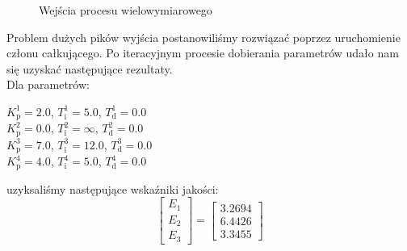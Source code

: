 \begin{figure}
    \begin{subfigure}[b]{\textwidth}
        \centering
    \end{subfigure}
    \caption{Wejścia procesu wielowymiarowego}
    \label{pro_pid_2_in}
\end{figure}
\FloatBarrier

Problem dużych pików wyjścia postanowiliśmy rozwiązać poprzez uruchomienie członu 
całkującego. Po iteracyjnym procesie dobierania parametrów udało nam się uzyskać następujące
rezultaty.\\

Dla parametrów: \\
\begin{center}
    $K^{\num{1}}_{\mathrm{p}} = \num{2.0}$, $T^{\num{1}}_{\mathrm{i}} = \num{5.0}$, $T^{\num{1}}_{\mathrm{d}} = \num{0.0}$ \\
    $K^{\num{2}}_{\mathrm{p}} = \num{0.0}$, $T^{\num{2}}_{\mathrm{i}} = \infty$, $T^{\num{2}}_{\mathrm{d}} = \num{0.0}$ \\
    $K^{\num{3}}_{\mathrm{p}} = \num{7.0}$, $T^{\num{3}}_{\mathrm{i}} = \num{12.0}$, $T^{\num{3}}_{\mathrm{d}} = \num{0.0}$ \\
    $K^{\num{4}}_{\mathrm{p}} = \num{4.0}$, $T^{\num{4}}_{\mathrm{i}} = \num{5.0}$, $T^{\num{4}}_{\mathrm{d}} = \num{0.0}$ \\
\end{center}

uzyksaliśmy następujące wskaźniki jakości:\\

\[
\begin{bmatrix}
    E_{\mathrm{1}} \\
    E_{\mathrm{2}} \\
    E_{\mathrm{3}} 
\end{bmatrix}
= 
\begin{bmatrix}
    \num{3.2694} \\
    \num{6.4426} \\
    \num{3.3455}
\end{bmatrix}
\]

